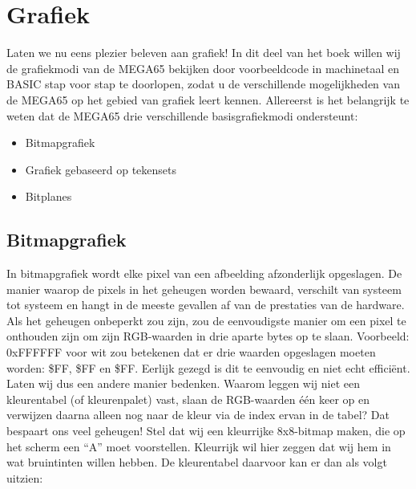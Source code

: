 
\newcommand{\blkb}{\cellcolor[rgb]{0,0,0}\textcolor{white} 0 }
\newcommand{\bwn}{\cellcolor[rgb]{.26,.22,0}\textcolor{white} 9 }
\newcommand{\ora}{\cellcolor[rgb]{.44,.31,.15}8 }
\newcommand{\red}{\cellcolor[rgb]{.6,.4,.35}A }
\newcommand{\lgr}{\cellcolor[rgb]{.58,.58,.58}F }
\newcommand{\yel}{\cellcolor[rgb]{1.,.95,0.}7 }

\newcommand{\redb}{\cellcolor[rgb]{.6,.4,.35} 1 }

\chapter{Grafiek}
\label{cha:graphics}

Laten we nu eens plezier beleven aan grafiek! In dit deel van het boek willen wij de grafiekmodi van de MEGA65 bekijken door voorbeeldcode in machinetaal en BASIC stap voor stap te doorlopen, zodat u de verschillende mogelijkheden van de MEGA65 op het gebied van grafiek leert kennen. Allereerst is het belangrijk te weten dat de MEGA65 drie verschillende basisgrafiekmodi ondersteunt:

\begin{itemize}
	\item Bitmapgrafiek	\item Grafiek gebaseerd op tekensets	\item Bitplanes
\end{itemize}


\section*{Bitmapgrafiek}

In bitmapgrafiek wordt elke pixel van een afbeelding afzonderlijk opgeslagen. De manier waarop de pixels in het geheugen worden bewaard, verschilt van systeem tot systeem en hangt in de meeste gevallen af van de prestaties van de hardware. Als het geheugen onbeperkt zou zijn, zou de eenvoudigste manier om een pixel te onthouden zijn om zijn RGB-waarden in drie aparte bytes op te slaan. Voorbeeld: 0xFFFFFF voor wit zou betekenen dat er drie waarden opgeslagen moeten worden: \$FF, \$FF en \$FF. Eerlijk gezegd is dit te eenvoudig en niet echt efficiënt. Laten wij dus een andere manier bedenken. Waarom leggen wij niet een kleurentabel (of kleurenpalet) vast, slaan de RGB-waarden één keer op en verwijzen daarna alleen nog naar de kleur via de index ervan in de tabel? Dat bespaart ons veel geheugen! Stel dat wij een kleurrijke 8x8-bitmap maken, die op het scherm een ``A'' moet voorstellen. Kleurrijk wil hier zeggen dat wij hem in wat bruintinten willen hebben. De kleurentabel daarvoor kan er dan als volgt uitzien:

